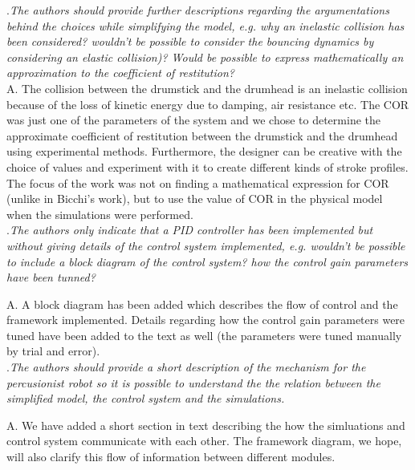\documentclass[]{article}
\begin{document}
.\textit{The authors should provide further descriptions regarding the argumentations behind the choices while simplifying the model, e.g.
	why an inelastic collision has been considered? wouldn't be possible to consider the bouncing dynamics by considering an elastic collision)?
	Would be possible to express mathematically an approximation to the coefficient of restitution?}\\

\noindent A. The collision between the drumstick and the drumhead is an inelastic collision because of the loss of kinetic energy due to damping, air resistance etc.
The COR was just one of the parameters of the system and we chose to determine the approximate coefficient of restitution between the drumstick and the drumhead using experimental methods. Furthermore, the designer can be creative with the choice of values and experiment with it to create different kinds of stroke profiles. The focus of the work was not on finding a mathematical expression for COR (unlike in Bicchi's work), but to use the value of COR in the physical model when the simulations were performed. \\

.\textit{The authors only indicate that a PID controller has been implemented but without giving details of the control system implemented,
	e.g. wouldn't be possible to include a block diagram of the control system? how the control gain parameters have been tunned?}

\noindent A. A block diagram has been added which describes the flow of control and the framework implemented. Details regarding how the control gain parameters were tuned have been added to the text as well (the parameters were tuned manually by trial and error). \\

.\textit{The authors should provide a short description of the mechanism for the percusionist robot so it is possible to understand the
	the relation between the simplified model, the control system and the simulations.}

\noindent A. We have added a short section in text describing the how the simluations and control system communicate with each other. The framework diagram, we hope, will also clarify this flow of information between different modules. \\
\end{document}
